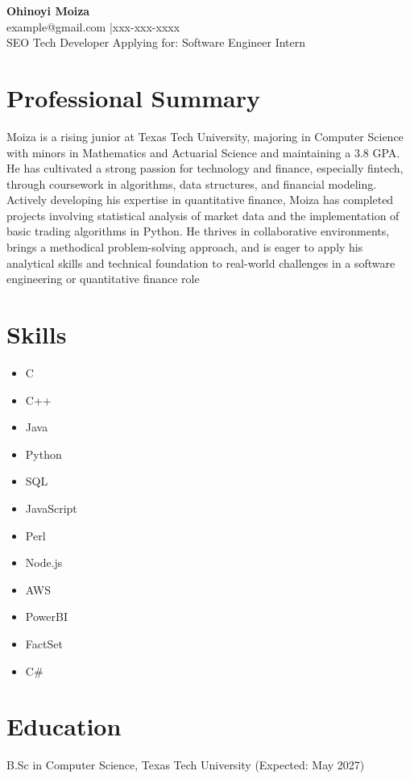 \documentclass{article}
\begin{document}
\begin{center}
  {\LARGE \textbf{Ohinoyi Moiza}}\\[0.5em]
  example@gmail.com \quad|\quad xxx-xxx-xxxx\\[1em]
  SEO Tech Developer \hfill Applying for: Software Engineer Intern
\end{center}

\section*{Professional Summary}
Moiza is a rising junior at Texas Tech University, majoring in Computer Science with minors in Mathematics and Actuarial Science and maintaining a 3.8 GPA. He has cultivated a strong passion for technology and finance, especially fintech, through coursework in algorithms, data structures, and financial modeling. Actively developing his expertise in quantitative finance, Moiza has completed projects involving statistical analysis of market data and the implementation of basic trading algorithms in Python. He thrives in collaborative environments, brings a methodical problem-solving approach, and is eager to apply his analytical skills and technical foundation to real-world challenges in a software engineering or quantitative finance role

\section*{Skills}
\begin{itemize}
  \item C
  \item C++
  \item Java
  \item Python
  \item SQL
  \item JavaScript
  \item Perl
  \item Node.js
  \item AWS
  \item PowerBI
  \item FactSet
  \item C#
\end{itemize}

\section*{Education}
B.Sc in Computer Science, Texas Tech University        (Expected: May 2027)
\end{document}
